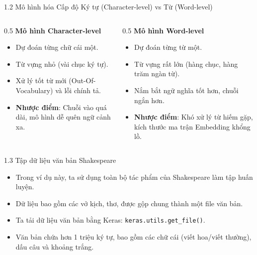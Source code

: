 \documentclass[aspectratio=169, 12pt]{beamer}
\begin{document}
\begin{frame}{1.2 Mô hình hóa Cấp độ Ký tự (Character-level) vs Từ (Word-level)}
    \begin{columns}
        \begin{column}{0.5\textwidth}
            \textbf{Mô hình Character-level}
            \begin{itemize}
                \item Dự đoán từng chữ cái một.
                \item Từ vựng nhỏ (vài chục ký tự).
                \item Xử lý tốt từ mới (Out-Of-Vocabulary) và lỗi chính tả.
                \item \textbf{Nhược điểm}: Chuỗi vào quá dài, mô hình dễ quên ngữ cảnh xa.
            \end{itemize}
        \end{column}
        \begin{column}{0.5\textwidth}
            \textbf{Mô hình Word-level}
            \begin{itemize}
                \item Dự đoán từng từ một.
                \item Từ vựng rất lớn (hàng chục, hàng trăm ngàn từ).
                \item Nắm bắt ngữ nghĩa tốt hơn, chuỗi ngắn hơn.
                \item \textbf{Nhược điểm}: Khó xử lý từ hiếm gặp, kích thước ma trận Embedding khổng lồ.
            \end{itemize}
        \end{column}
    \end{columns}
\end{frame}

\begin{frame}{1.3 Tập dữ liệu văn bản Shakespeare}
    \begin{itemize}
        \item Trong ví dụ này, ta sử dụng toàn bộ tác phẩm của Shakespeare làm tập huấn luyện.
        \item Dữ liệu bao gồm các vở kịch, thơ, được gộp chung thành một file văn bản.
        \item Ta tải dữ liệu văn bản bằng Keras: \texttt{keras.utils.get\_file()}.
        \item Văn bản chứa hơn 1 triệu ký tự, bao gồm các chữ cái (viết hoa/viết thường), dấu câu và khoảng trắng.
    \end{itemize}
\end{frame}
\end{document}
